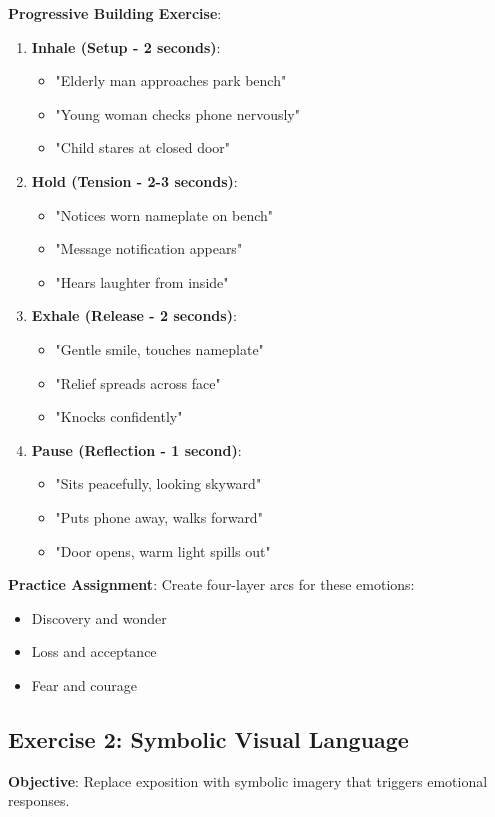 \textbf{Progressive Building Exercise}:
\begin{enumerate}
\item \textbf{Inhale (Setup - 2 seconds)}:
   \begin{itemize}
   \item "Elderly man approaches park bench"
   \item "Young woman checks phone nervously"
   \item "Child stares at closed door"
   \end{itemize}
\item \textbf{Hold (Tension - 2-3 seconds)}:
   \begin{itemize}
   \item "Notices worn nameplate on bench"
   \item "Message notification appears"
   \item "Hears laughter from inside"
   \end{itemize}
\item \textbf{Exhale (Release - 2 seconds)}:
   \begin{itemize}
   \item "Gentle smile, touches nameplate"
   \item "Relief spreads across face"
   \item "Knocks confidently"
   \end{itemize}
\item \textbf{Pause (Reflection - 1 second)}:
   \begin{itemize}
   \item "Sits peacefully, looking skyward"
   \item "Puts phone away, walks forward"
   \item "Door opens, warm light spills out"
   \end{itemize}
\end{enumerate}

\textbf{Practice Assignment}: Create four-layer arcs for these emotions:
\begin{itemize}
\item Discovery and wonder
\item Loss and acceptance
\item Fear and courage
\end{itemize}

\subsection*{Exercise 2: Symbolic Visual Language}
\textbf{Objective}: Replace exposition with symbolic imagery that triggers emotional responses.

